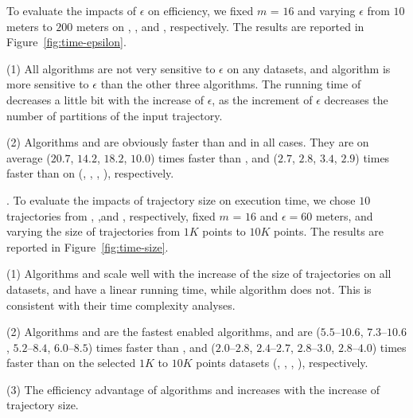 To evaluate the impacts of $\epsilon$ on efficiency, we fixed $m$ = $16$ and varying $\epsilon$  from $10$ meters to $200$ meters on \truck, \sercar, \geolife and \pricar, respectively.
The results are reported in Figure~\ref{fig:time-epsilon}.

\ni(1) All algorithms are not very sensitive to $\epsilon$ on any datasets, and algorithm \dps is more sensitive to $\epsilon$ than the other three algorithms.
The running time of \dps decreases a little bit with the increase of $\epsilon$, as the increment of $\epsilon$ decreases the number of partitions of the input trajectory.


\ni(2) Algorithms \cist and \cista are obviously faster than \dps and \squishe in all cases.
They are on average ($20.7$, $14.2$, $18.2$, $10.0$) times faster than \dps, and ($2.7$, $2.8$, $3.4$, {$2.9$}) times faster than \squishe on (\truck, \sercar, {\geolife}, \pricar), respectively.


.
To evaluate the impacts of trajectory size on execution time,
we chose {$10$} trajectories from \truck, \sercar,\geolife and \pricar, respectively,
fixed $m$ = $16$ and $\epsilon = 60$ meters, and varying the size  of trajectories from $1K$ points to $10K$ points.
%
The results are reported in Figure~\ref{fig:time-size}.

\ni(1) Algorithms \cist and \cista scale well with the increase of the size of trajectories on all datasets,
and have a linear running time, while algorithm \dps does not.
This is consistent with their time complexity analyses.

\ni(2) Algorithms \cist and \cista are the fastest \sed enabled \lsa algorithms, and are {($5.5$--$10.6$, $7.3$--$10.6$, $5.2$--$8.4$, $6.0$--$8.5$)} times faster than \dps,
and {($2.0$--$2.8$, $2.4$--$2.7$, $2.8$--$3.0$, $2.8$--$4.0$)} times faster than \squishe on the selected $1K$ to $10K$ points datasets (\truck, \sercar, \geolife, \pricar), respectively.

\ni(3) The efficiency advantage of algorithms \cist and \cista increases with the increase of trajectory size.




